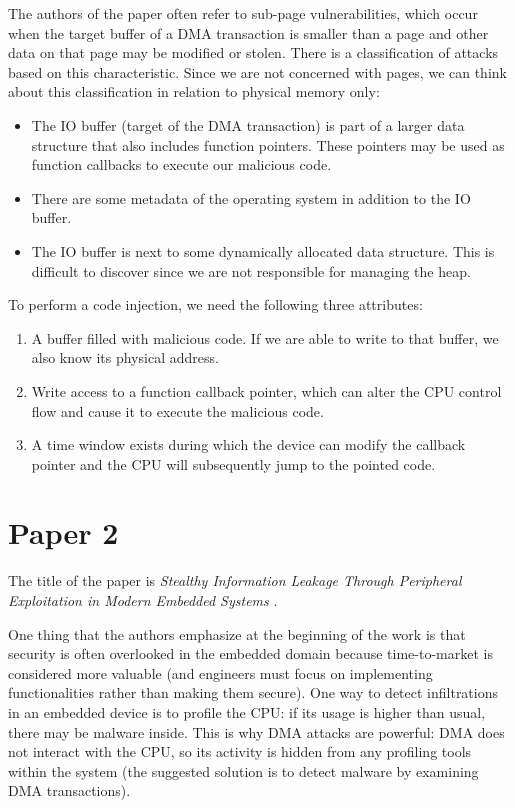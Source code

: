 The authors of the paper often refer to sub-page vulnerabilities, which occur when the target buffer of a DMA transaction is smaller than a page and other data on that page may be modified or stolen. There is a classification of attacks based on this characteristic. Since we are not concerned with pages, we can think about this classification in relation to physical memory only:
\begin{itemize}
    \item The IO buffer (target of the DMA transaction) is part of a larger data structure that also includes function pointers. These pointers may be used as function callbacks to execute our malicious code.
    \item There are some metadata of the operating system in addition to the IO buffer.
    \item The IO buffer is next to some dynamically allocated data structure. This is difficult to discover since we are not responsible for managing the heap.
\end{itemize}

To perform a code injection, we need the following three attributes:
\begin{enumerate}
    \item A buffer filled with malicious code. If we are able to write to that buffer, we also know its physical address. 
    \item Write access to a function callback pointer, which can alter the CPU control flow and cause it to execute the malicious code. 
    \item A time window exists during which the device can modify the callback pointer and the CPU will subsequently jump to the pointed code.
\end{enumerate}

\section{Paper 2}
The title of the paper is \textit{Stealthy Information Leakage Through Peripheral Exploitation in Modern Embedded Systems} \cite{9091580}. 

One thing that the authors emphasize at the beginning of the work is that security is often overlooked in the embedded domain because time-to-market is considered more valuable (and engineers must focus on implementing functionalities rather than making them secure). One way to detect infiltrations in an embedded device is to profile the CPU: if its usage is higher than usual, there may be malware inside. This is why DMA attacks are powerful: DMA does not interact with the CPU, so its activity is hidden from any profiling tools within the system (the suggested solution is to detect malware by examining DMA transactions).

